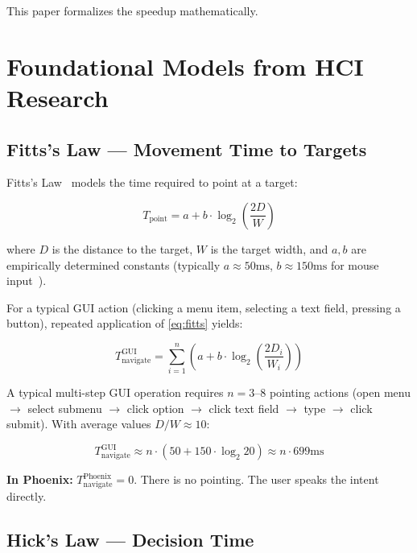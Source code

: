 \documentclass[11pt, a4paper]{article}
\begin{document}
This paper formalizes the speedup mathematically.

\section{Foundational Models from HCI Research}

\subsection{Fitts's Law --- Movement Time to Targets}

Fitts's Law~\cite{fitts1954} models the time required to point at a target:

\begin{equation}
  T_{\text{point}} = a + b \cdot \log_2\!\left(\frac{2D}{W}\right)
  \label{eq:fitts}
\end{equation}

where $D$ is the distance to the target, $W$ is the target width, and $a, b$
are empirically determined constants (typically $a \approx 50\text{ms}$,
$b \approx 150\text{ms}$ for mouse input~\cite{soukoreff2004}).

For a typical GUI action (clicking a menu item, selecting a text field, pressing
a button), repeated application of \eqref{eq:fitts} yields:

\begin{equation}
  T_{\text{navigate}}^{\text{GUI}} = \sum_{i=1}^{n} \left(a + b \cdot \log_2\!\left(\frac{2D_i}{W_i}\right)\right)
  \label{eq:fitts_sum}
\end{equation}

A typical multi-step GUI operation requires $n = 3\text{--}8$ pointing actions
(open menu $\to$ select submenu $\to$ click option $\to$ click text field $\to$
type $\to$ click submit). With average values $D/W \approx 10$:

\begin{equation}
  T_{\text{navigate}}^{\text{GUI}} \approx n \cdot (50 + 150 \cdot \log_2 20) \approx n \cdot 699\text{ms}
\end{equation}

\textbf{In Phoenix:} $T_{\text{navigate}}^{\text{Phoenix}} = 0$. There is no pointing.
The user speaks the intent directly.

\subsection{Hick's Law --- Decision Time}
\end{document}
